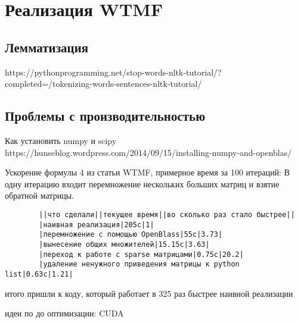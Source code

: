 \section{Реализация WTMF}
    \subsection{Лемматизация}
        https://pythonprogramming.net/stop-words-nltk-tutorial/?completed=/tokenizing-words-sentences-nltk-tutorial/

    \subsection{Проблемы с производительностью}
        Как установить numpy и scipy
        https://hunseblog.wordpress.com/2014/09/15/installing-numpy-and-openblas/


        Ускорение формулы 4 из статьи WTMF, примерное время за 100 итераций:
        В одну итерацию входит перемножение нескольких больших матриц и взятие обратной матрицы.

        \begin{verbatim}
        ||что сделали||текущее время||во сколько раз стало быстрее||
        |наивная реализация|205с|1|
        |перемножение с помощью OpenBlass|55с|3.73|
        |вынесение общих множителей|15.15с|3.63|
        |переход к работе с sparse матрицами|0.75с|20.2|
        |удаление ненужного приведения матрицы к python list|0.63c|1.21|
        \end{verbatim}
        итого пришли к коду, который работает в 325 раз быстрее наивной реализации

        идеи по до оптимизации: CUDA
